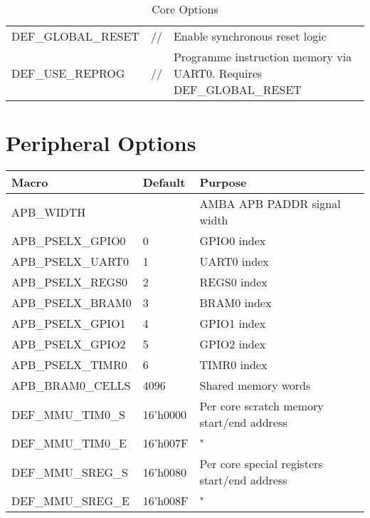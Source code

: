 \begin{appendices}
\begin{table}[H]
\begin{tabular}{l|l|p{8cm}}
DEF\_GLOBAL\_RESET           & //      & Enable synchronous reset logic \\

DEF\_USE\_REPROG           & //      & Programme instruction memory via UART0. Requires DEF\_GLOBAL\_RESET\\
\end{tabular}
\caption{Core Options}
\label{tab:isa}
\end{table}

\section{Peripheral Options}
\begin{table}[H]
\centering
\begin{tabular}{l|l|l}
Macro              & Default  & Purpose                                              \\ 
\hline
APB\_WIDTH         &          & AMBA APB PADDR signal width                          \\
APB\_PSELX\_GPIO0  & 0        & GPIO0 index                                          \\
APB\_PSELX\_UART0  & 1        & UART0 index                                          \\
APB\_PSELX\_REGS0  & 2        & REGS0 index                                          \\
APB\_PSELX\_BRAM0  & 3        & BRAM0 index                                          \\
APB\_PSELX\_GPIO1  & 4        & GPIO1 index                                          \\
APB\_PSELX\_GPIO2  & 5        & GPIO2 index                                          \\
APB\_PSELX\_TIMR0  & 6        & TIMR0 index                                          \\
APB\_BRAM0\_CELLS  & 4096     & Shared memory words                                  \\
DEF\_MMU\_TIM0\_S  & 16'h0000 & Per core scratch memory start/end address            \\
DEF\_MMU\_TIM0\_E  & 16'h007F & "                                                    \\
DEF\_MMU\_SREG\_S  & 16'h0080 & Per core special registers start/end address         \\
DEF\_MMU\_SREG\_E  & 16'h008F & "                                                    \\

\end{tabular}
\end{table}
\end{appendices}
